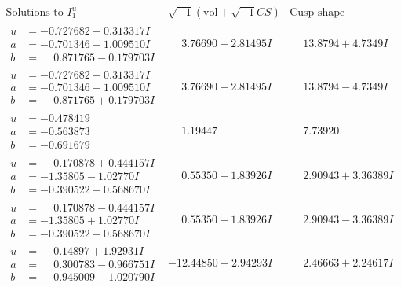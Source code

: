 \documentclass[1p]{elsarticle_modified}
\theoremstyle{definition}
\newcommand{\I}{\sqrt{-1}}
\begin{document}
$$\begin{array}{c|c|c}  
\text{Solutions to }I^u_{1}& \I (\text{vol} + \sqrt{-1}CS) & \text{Cusp shape}\\
 \hline 
\begin{aligned}
u &= -0.727682 + 0.313317 I \\
a &= -0.701346 + 1.009510 I \\
b &= \phantom{-}0.871765 - 0.179703 I\end{aligned}
 & \phantom{-}3.76690 - 2.81495 I & \phantom{-}13.8794 + 4.7349 I \\ \hline\begin{aligned}
u &= -0.727682 - 0.313317 I \\
a &= -0.701346 - 1.009510 I \\
b &= \phantom{-}0.871765 + 0.179703 I\end{aligned}
 & \phantom{-}3.76690 + 2.81495 I & \phantom{-}13.8794 - 4.7349 I \\ \hline\begin{aligned}
u &= -0.478419\phantom{ +0.000000I} \\
a &= -0.563873\phantom{ +0.000000I} \\
b &= -0.691679\phantom{ +0.000000I}\end{aligned}
 & \phantom{-}1.19447\phantom{ +0.000000I} & \phantom{-}7.73920\phantom{ +0.000000I} \\ \hline\begin{aligned}
u &= \phantom{-}0.170878 + 0.444157 I \\
a &= -1.35805 - 1.02770 I \\
b &= -0.390522 + 0.568670 I\end{aligned}
 & \phantom{-}0.55350 - 1.83926 I & \phantom{-}2.90943 + 3.36389 I \\ \hline\begin{aligned}
u &= \phantom{-}0.170878 - 0.444157 I \\
a &= -1.35805 + 1.02770 I \\
b &= -0.390522 - 0.568670 I\end{aligned}
 & \phantom{-}0.55350 + 1.83926 I & \phantom{-}2.90943 - 3.36389 I \\ \hline\begin{aligned}
u &= \phantom{-}0.14897 + 1.92931 I \\
a &= \phantom{-}0.300783 - 0.966751 I \\
b &= \phantom{-}0.945009 - 1.020790 I\end{aligned}
 & -12.44850 - 2.94293 I & \phantom{-}2.46663 + 2.24617 I \\ \hline\begin{aligned}

\end{aligned}
\end{array}$$
\end{document}
